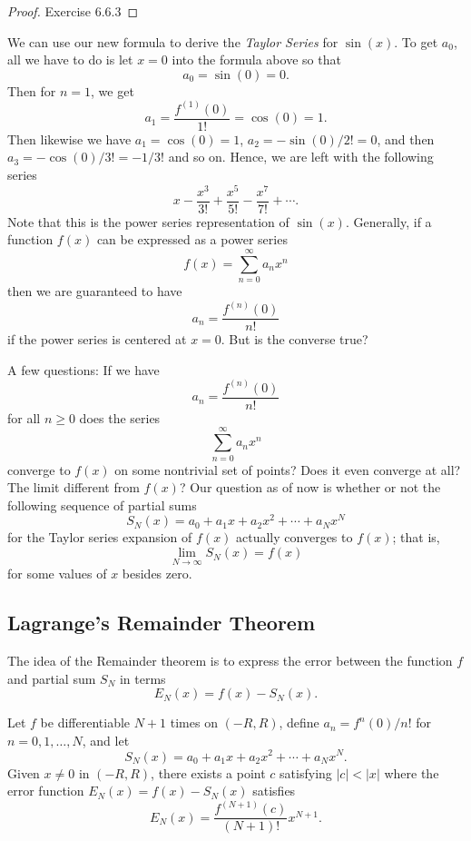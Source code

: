 \begin{proof}
Exercise 6.6.3
\end{proof}

We can use our new formula to derive the \textit{Taylor Series} for \( \sin(x)  \). To get \( a_{0} \), all we have to do is let \( x = 0  \) into the formula above so that 
\[  a_{0} = \sin(0) = 0. \] Then for \( n =1  \), we get 
\[  a_{1} = \frac{ f^{(1)}(0) }{ 1! } = \cos(0) = 1.  \]
Then likewise we have \( a_{1} = \cos(0) = 1  \), \( a_{2} = - \sin(0) / 2! = 0  \), and then \( a_{3} = - \cos(0) / 3! = -1/ 3! \) and so on. Hence, we are left with the following series
\[  x - \frac{ x^{3} }{ 3! }  + \frac{ x^{5} }{ 5! }  - \frac{ x^{7} }{ 7! }  + \dotsb .  \]
Note that this is the power series representation of \( \sin(x)  \). Generally, if a function \( f(x)  \) can be expressed as a power series
\[  f(x) = \sum_{ n=0 }^{ \infty  } a_{n} x^{n} \] then we are guaranteed to have 
\[  a_n = \frac{ f^{(n)}(0) }{ n! } \]
if the power series is centered at \( x = 0  \). But is the converse true? 

A few questions: 
     If we have 
        \[  a_n = \frac{ f^{(n)}(0) }{ n! }  \] for all \( n \geq 0  \) does the series
        \[  \sum_{ n=0 }^{ \infty  } a_n x^{n} \] converge to \( f(x)  \) on some nontrivial set of points?  Does it even converge at all? The limit different from \( f(x)  \)? Our question as of now is whether or not the following sequence of partial sums
        \[  S_{N}(x) = a_{0} + a_{1} x  + a_{2} x^{2} + \dotsb + a_{N} x^{N }  \] for the Taylor series expansion of \( f(x)  \) actually converges to \( f(x)  \); that is, 
        \[ \lim_{ N \to \infty  }  S_{N}(x) = f(x) \]
        for some values of \( x  \) besides zero.

    \subsection{Lagrange's Remainder Theorem}

The idea of the Remainder theorem is to express the error between the function \( f  \) and partial sum \( S_N  \) in terms 
\[  E_N (x) = f(x) - S_N(x).\]

\begin{theorem}
    Let \( f  \) be differentiable \( N + 1  \) times on \( (-R ,R ) \), define \( a_n = f^{n}(0) / n!  \) for \( n = 0, 1 , \dots , N  \), and let 
    \[  S_N(x) = a_0 + a_{1} x + a_{2}x^{2} + \dotsb + a_{N}x^{N}. \]
    Given \( x \neq 0  \) in \( (-R ,R ) \), there exists a point \( c  \) satisfying \( | c  |  < | x  |  \) where the error function \( E_N(x) = f(x) - S_N(x)  \) satisfies 
    \[  E_N(x) = \frac{ f^{(N+1)}(c) }{ (N+1)!  } x^{N+1}. \]
    \end{theorem}


